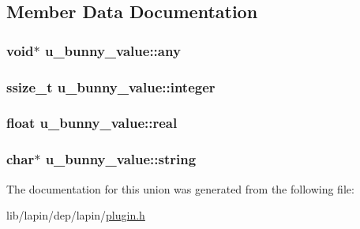 \subsection{Member Data Documentation}
\hypertarget{unionu__bunny__value_a89d2a2af87226cec36e7ceeae10cae8f}{
\subsubsection[{any}]{\setlength{\rightskip}{0pt plus 5cm}void$\ast$ u\-\_\-bunny\-\_\-value\-::any}}\label{unionu__bunny__value_a89d2a2af87226cec36e7ceeae10cae8f}
\hypertarget{unionu__bunny__value_a4e4c4f6aae60a87d4bfed3058658d0a4}{
\subsubsection[{integer}]{\setlength{\rightskip}{0pt plus 5cm}ssize\-\_\-t u\-\_\-bunny\-\_\-value\-::integer}}\label{unionu__bunny__value_a4e4c4f6aae60a87d4bfed3058658d0a4}
\hypertarget{unionu__bunny__value_a451a5ceae83c27a4110884d6460910c3}{
\subsubsection[{real}]{\setlength{\rightskip}{0pt plus 5cm}float u\-\_\-bunny\-\_\-value\-::real}}\label{unionu__bunny__value_a451a5ceae83c27a4110884d6460910c3}
\hypertarget{unionu__bunny__value_aa8a6bf15145c0cafc4c67353701228ac}{
\subsubsection[{string}]{ char$\ast$ u\-\_\-bunny\-\_\-value\-::string}}\label{unionu__bunny__value_aa8a6bf15145c0cafc4c67353701228ac}


The documentation for this union was generated from the following file\-:\begin{DoxyCompactItemize}
\item 
lib/lapin/dep/lapin/\hyperlink{plugin_8h}{plugin.\-h}\end{DoxyCompactItemize}
